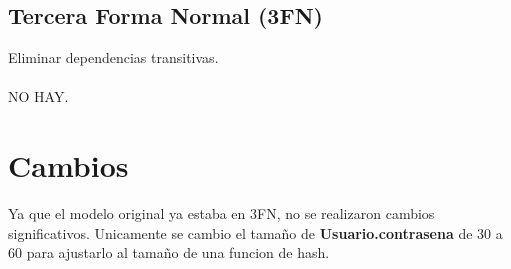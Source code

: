\documentclass{article}
\begin{document}
\subsection{Tercera Forma Normal (3FN)}
Eliminar dependencias transitivas.\\\\
NO HAY.

\section{Cambios}
Ya que el modelo original ya estaba en 3FN, no se realizaron cambios significativos.
Unicamente se cambio el tamaño de \textbf{Usuario.contrasena} de 30 a 60 para ajustarlo al tamaño de una funcion de hash.
\end{document}
